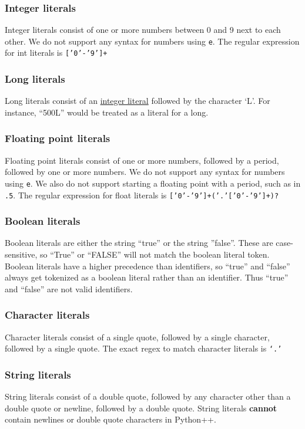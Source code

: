 \documentclass{article}
\begin{document}
\subsubsection{Integer literals}
\label{sec:intliterals}
Integer literals consist of one or more numbers between 0 and 9 next to each other. We do not support any syntax for numbers using \texttt{e}. The regular expression for int literals is \texttt{['0'-'9']+}

\subsubsection{Long literals}
\label{sec:longliterals}
Long literals consist of an \hyperref[sec:intliterals]{integer literal} followed by the character `L'. For instance, ``500L'' would be treated as a literal for a long.

\subsubsection{Floating point literals}
Floating point literals consist of one or more numbers, followed by a period, followed by one or more numbers. We do not support any syntax for numbers using \texttt{e}. We also do not support starting a floating point with a period, such as in \texttt{.5}. The regular expression for float literals is \texttt{['0'-'9']+('.'['0'-'9']+)?}

\subsubsection{Boolean literals}
Boolean literals are either the string ``true'' or the string ''false''. These are case-sensitive, so ``True'' or ``FALSE'' will not match the boolean literal token. Boolean literals have a higher precedence than identifiers, so ``true'' and ``false'' always get tokenized as a boolean literal rather than an identifier. Thus ``true'' and ``false'' are not valid identifiers.

\subsubsection{Character literals}
Character literals consist of a single quote, followed by a single character, followed by a single quote. The exact regex to match character literals is \texttt{`.'} 

\subsubsection{String literals}
String literals consist of a double quote, followed by any character other than a double quote or newline, followed by a double quote. String literals \textbf{cannot} contain newlines or double quote characters in Python++.
\end{document}
